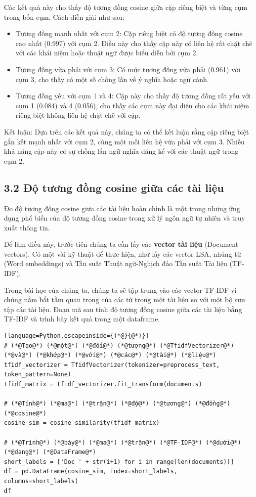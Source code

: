 Các kết quả này cho thấy độ tương đồng cosine giữa cặp riêng biệt và từng cụm trong bốn cụm. Cách diễn giải như sau:

\begin{itemize}
  \item Tương đồng mạnh nhất với cụm 2: Cặp riêng biệt có độ tương đồng cosine cao nhất (0.997) với cụm 2. Điều này cho thấy cặp này có liên hệ rất chặt chẽ với các khái niệm hoặc thuật ngữ được biểu diễn bởi cụm 2.
  \item Tương đồng vừa phải với cụm 3: Có mức tương đồng vừa phải (0.961) với cụm 3, cho thấy có một số chồng lấn về ý nghĩa hoặc ngữ cảnh.
  \item Tương đồng yếu với cụm 1 và 4: Cặp này cho thấy độ tương đồng rất yếu với cụm 1 (0.084) và 4 (0.056), cho thấy các cụm này đại diện cho các khái niệm riêng biệt không liên hệ chặt chẽ với cặp.
\end{itemize}

Kết luận: Dựa trên các kết quả này, chúng ta có thể kết luận rằng cặp riêng biệt gắn kết mạnh nhất với cụm 2, cùng một mối liên hệ vừa phải với cụm 3. Nhiều khả năng cặp này có sự chồng lấn ngữ nghĩa đáng kể với các thuật ngữ trong cụm 2.

\subsection*{3.2 Độ tương đồng cosine giữa các tài liệu}

Đo độ tương đồng cosine giữa các tài liệu hoàn chỉnh là một trong những ứng dụng phổ biến của độ tương đồng cosine trong xử lý ngôn ngữ tự nhiên và truy xuất thông tin.

Để làm điều này, trước tiên chúng ta cần lấy các \textbf{vector tài liệu} (Document vectors). Có một vài kỹ thuật để thực hiện, như lấy các vector LSA, nhúng từ (Word embeddings) và Tần suất Thuật ngữ-Nghịch đảo Tần suất Tài liệu (TF-IDF).

Trong bài học của chúng ta, chúng ta sẽ tập trung vào các vector TF-IDF vì chúng nắm bắt tầm quan trọng của các từ trong một tài liệu so với một bộ sưu tập các tài liệu. Đoạn mã sau tính độ tương đồng cosine giữa các tài liệu bằng TF-IDF và trình bày kết quả trong một dataframe.

\begin{lstlisting}[language=Python,escapeinside={(*@}{@*)}]
# (*@Tạo@*) (*@một@*) (*@đối@*) (*@tượng@*) (*@TfidfVectorizer@*) (*@và@*) (*@khớp@*) (*@với@*) (*@các@*) (*@tài@*) (*@liệu@*)
tfidf_vectorizer = TfidfVectorizer(tokenizer=preprocess_text, token_pattern=None)
tfidf_matrix = tfidf_vectorizer.fit_transform(documents)

# (*@Tính@*) (*@ma@*) (*@trận@*) (*@độ@*) (*@tương@*) (*@đồng@*) (*@cosine@*)
cosine_sim = cosine_similarity(tfidf_matrix)

# (*@Trình@*) (*@bày@*) (*@ma@*) (*@trận@*) (*@TF-IDF@*) (*@dưới@*) (*@dạng@*) (*@DataFrame@*)
short_labels = ['Doc ' + str(i+1) for i in range(len(documents))]
df = pd.DataFrame(cosine_sim, index=short_labels, columns=short_labels)
df
\end{lstlisting}

